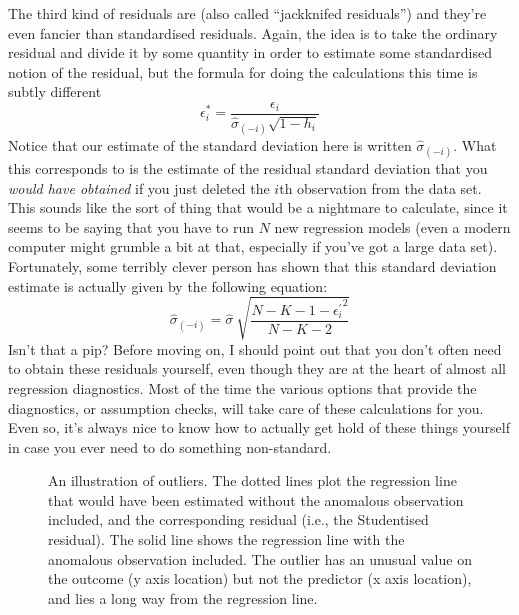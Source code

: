 The third kind of residuals are  (also called ``jackknifed residuals'') and they're even fancier than standardised residuals. Again, the idea is to take the ordinary residual and divide it by some quantity in order to estimate some standardised notion of the residual, but the formula for doing the calculations this time is subtly different
$$
\epsilon_{i}^* = \frac{\epsilon_i}{\hat{\sigma}_{(-i)} \sqrt{1-h_i}}
$$
Notice that our estimate of the standard deviation here is written $\hat{\sigma}_{(-i)}$. What this corresponds to is the estimate of the residual standard deviation that you {\it would have obtained} if you just deleted the $i$th observation from the data set. This sounds like the sort of thing that would be a nightmare to calculate, since it seems to be saying that you have to run $N$ new regression models (even a modern computer might grumble a bit at that, especially if you've got a large data set). Fortunately, some terribly clever person has shown that this standard deviation estimate is actually given by the following equation:
$$
\hat\sigma_{(-i)} = \hat{\sigma} \ \sqrt{\frac{N-K-1 - {\epsilon_{i}^\prime}^2}{N-K-2}}
$$
Isn't that a pip? Before moving on, I should point out that you don't often need to obtain these residuals yourself, even though they are at the heart of almost all regression diagnostics. Most of the time the various options that provide the diagnostics, or assumption checks, will take care of these calculations for you. Even so, it's always nice to know how to actually get hold of these things yourself in case you ever need to do something non-standard.



\begin{figure}[!htb]
\begin{center}
\caption{An illustration of outliers. The dotted lines plot the regression line that would have been estimated without the anomalous observation included, and the corresponding residual (i.e., the Studentised residual). The solid line shows the regression line with the anomalous observation included. The outlier has an unusual value on the outcome (y axis location) but not the predictor (x axis location), and lies a long way from the regression line.}
\HR
\label{fig:outlier}
\end{center}
\end{figure}

